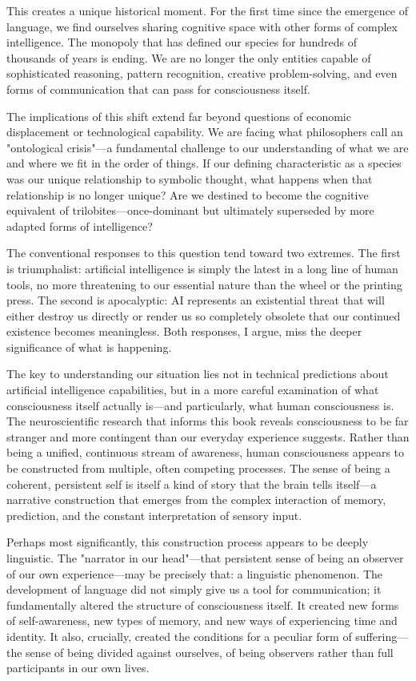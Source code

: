 \documentclass[12pt,letterpaper]{book}
\begin{document}
This creates a unique historical moment. For the first time since the emergence of language, we find ourselves sharing cognitive space with other forms of complex intelligence. The monopoly that has defined our species for hundreds of thousands of years is ending. We are no longer the only entities capable of sophisticated reasoning, pattern recognition, creative problem-solving, and even forms of communication that can pass for consciousness itself.

The implications of this shift extend far beyond questions of economic displacement or technological capability. We are facing what philosophers call an "ontological crisis"—a fundamental challenge to our understanding of what we are and where we fit in the order of things. If our defining characteristic as a species was our unique relationship to symbolic thought, what happens when that relationship is no longer unique? Are we destined to become the cognitive equivalent of trilobites—once-dominant but ultimately superseded by more adapted forms of intelligence?

The conventional responses to this question tend toward two extremes. The first is triumphalist: artificial intelligence is simply the latest in a long line of human tools, no more threatening to our essential nature than the wheel or the printing press. The second is apocalyptic: AI represents an existential threat that will either destroy us directly or render us so completely obsolete that our continued existence becomes meaningless. Both responses, I argue, miss the deeper significance of what is happening.

The key to understanding our situation lies not in technical predictions about artificial intelligence capabilities, but in a more careful examination of what consciousness itself actually is—and particularly, what human consciousness is. The neuroscientific research that informs this book reveals consciousness to be far stranger and more contingent than our everyday experience suggests. Rather than being a unified, continuous stream of awareness, human consciousness appears to be constructed from multiple, often competing processes. The sense of being a coherent, persistent self is itself a kind of story that the brain tells itself—a narrative construction that emerges from the complex interaction of memory, prediction, and the constant interpretation of sensory input.

Perhaps most significantly, this construction process appears to be deeply linguistic. The "narrator in our head"—that persistent sense of being an observer of our own experience—may be precisely that: a linguistic phenomenon. The development of language did not simply give us a tool for communication; it fundamentally altered the structure of consciousness itself. It created new forms of self-awareness, new types of memory, and new ways of experiencing time and identity. It also, crucially, created the conditions for a peculiar form of suffering—the sense of being divided against ourselves, of being observers rather than full participants in our own lives.
\end{document}
